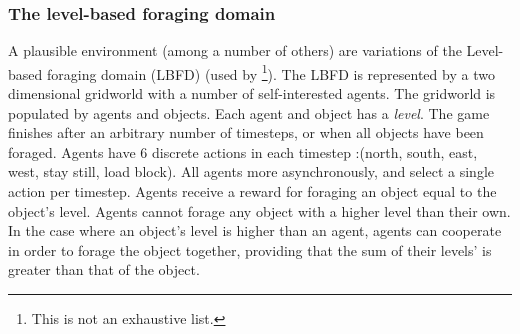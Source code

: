 \subsubsection{The level-based foraging domain}
A plausible environment (among a number of others) are variations of the Level-based foraging domain (LBFD) (used by \cite{Albrecht2019,Barrett2015,Hayashi_et_al2020,Papoudakis2020}\footnote{This is not an exhaustive list.}). The LBFD is represented by a two dimensional gridworld with a number of self-interested agents.
The gridworld is populated by agents and objects. Each agent and object has a \textit{level}. The game finishes after an arbitrary number of timesteps, or when all objects have been foraged. Agents have 6 discrete actions in each timestep :(north, south, east, west, stay still, load block). All agents more asynchronously, and select a single action per timestep. Agents receive a reward for foraging an object equal to the object's level. Agents cannot forage any object with a higher level than their own. In the case where an object's level is higher than an agent, agents can cooperate in order to forage the object together, providing that the sum of their levels' is greater than that of the object.  
